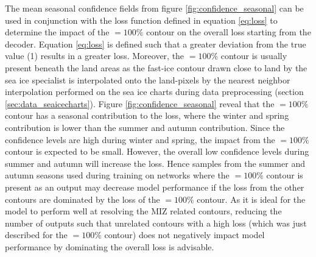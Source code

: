 \documentclass[../main/thesis]{subfiles}
\begin{document}
The mean seasonal confidence fields from figure \ref{fig:confidence_seasonal} can be used in conjunction with the loss function defined in equation \ref{eq:loss} to determine the impact of the $=100\%$ contour on the overall loss starting from the decoder. Equation \ref{eq:loss} is defined such that a greater deviation from the true value (1) results in a greater loss. Moreover, the $=100\%$ contour is usually present beneath the land areas as the fast-ice contour drawn close to land by the sea ice specialist is interpolated onto the land-pixels by the nearest neighbor interpolation \citep{Wang2017} performed on the sea ice charts during data preprocessing (section \ref{sec:data_seaicecharts}). Figure \ref{fig:confidence_seasonal} reveal that the $=100\%$ contour has a seasonal contribution to the loss, where the winter and spring contribution is lower than the summer and autumn contribution. Since the confidence levels are high during winter and spring, the impact from the $=100\%$ contour is expected to be small. However, the overall low confidence levels during summer and autumn will increase the loss. Hence samples from the summer and autumn seasons used during training on networks where the $=100\%$ contour is present as an output may decrease model performance if the loss from the other contours are dominated by the loss of the $=100\%$ contour. As it is ideal for the model to perform well at resolving the MIZ related contours, reducing the number of outputs such that unrelated contours with a high loss (which was just described for the $=100\%$ contour) does not negatively impact model performance by dominating the overall loss is advisable.
\end{document}
